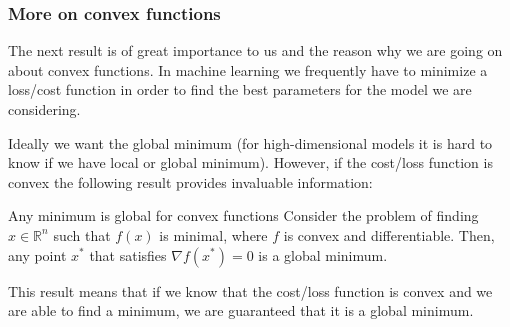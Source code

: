 \documentclass{beamer}
\begin{document}
\begin{frame}
\frametitle{More on convex functions}

The next result is of great importance to us and the reason why we are
going on about convex functions. In machine learning we frequently
have to minimize a loss/cost function in order to find the best
parameters for the model we are considering. 

Ideally we want the
global minimum (for high-dimensional models it is hard to know
if we have local or global minimum). However, if the cost/loss function
is convex the following result provides invaluable information:

\begin{block}{Any minimum is global for convex functions }
Consider the problem of finding $x \in \mathbb{R}^n$ such that $f(x)$
is minimal, where $f$ is convex and differentiable. Then, any point
$x^*$ that satisfies $\nabla f(x^*) = 0$ is a global minimum.
\end{block}

This result means that if we know that the cost/loss function is convex and we are able to find a minimum, we are guaranteed that it is a global minimum.
\end{frame}
\end{document}
